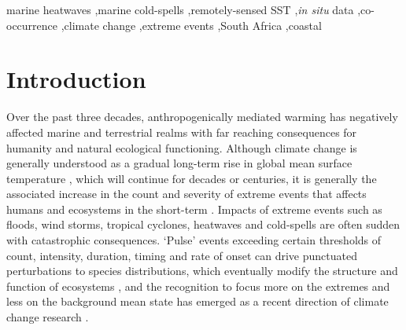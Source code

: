 \documentclass[a4paper,10pt,review]{elsarticle}
\begin{document}
\begin{frontmatter}
\begin{keyword}
marine heatwaves \sep marine cold-spells \sep remotely-sensed SST \sep \emph{in situ} data \sep co-occurrence \sep climate change \sep extreme events \sep South Africa \sep coastal
\end{keyword}

\end{frontmatter}

\linenumbers

\section{Introduction}
Over the past three decades, anthropogenically mediated warming has negatively affected marine and terrestrial realms with far reaching consequences for humanity and natural ecological functioning. Although climate change is generally understood as a gradual long-term rise in global mean surface temperature \citep{IPCC2014}, which will continue for decades or centuries, it is generally the associated increase in the count and severity of extreme events that affects humans and ecosystems in the short-term \citep{Easterling2000}. Impacts of extreme events such as floods, wind storms, tropical cyclones, heatwaves and cold-spells are often sudden with catastrophic consequences. `Pulse' events exceeding certain thresholds of count, intensity, duration, timing and rate of onset can drive punctuated perturbations to species distributions, which eventually modify the structure and function of ecosystems \citep{Wernberg2013, Rehage2016}, and the recognition to focus more on the extremes and less on the background mean state has emerged as a recent direction of climate change research \citep{Jentsch2007}.
\end{document}
